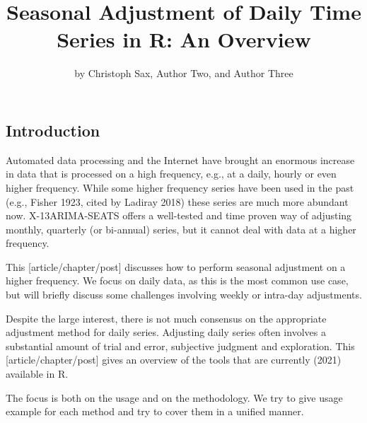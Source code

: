 \title{Seasonal Adjustment of Daily Time Series in R: An Overview}
\author{by Christoph Sax, Author Two, and Author Three}

\maketitle


\hypertarget{introduction}{%
\subsection{Introduction}\label{introduction}}

Automated data processing and the Internet have brought an enormous
increase in data that is processed on a high frequency, e.g., at a
daily, hourly or even higher frequency. While some higher frequency
series have been used in the past (e.g., Fisher 1923, cited by Ladiray
2018) these series are much more abundant now. X-13ARIMA-SEATS offers a
well-tested and time proven way of adjusting monthly, quarterly (or
bi-annual) series, but it cannot deal with data at a higher frequency.

This {[}article/chapter/post{]} discusses how to perform seasonal
adjustment on a higher frequency. We focus on daily data, as this is the
most common use case, but will briefly discuss some challenges involving
weekly or intra-day adjustments.

Despite the large interest, there is not much consensus on the
appropriate adjustment method for daily series. Adjusting daily series
often involves a substantial amount of trial and error, subjective
judgment and exploration. This {[}article/chapter/post{]} gives an
overview of the tools that are currently (2021) available in R.

The focus is both on the usage and on the methodology. We try to give
usage example for each method and try to cover them in a unified manner.

